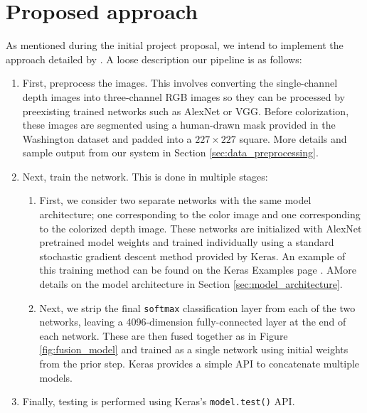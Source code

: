 \documentclass[paper=letter, fontsize=12pt]{article}
\begin{document}
\section{Proposed approach}

As mentioned during the initial project proposal, we intend to implement the approach detailed by \cite{Eitel2015}. A loose description our pipeline is as follows:

\begin{enumerate}

	\item
	First, preprocess the images. This involves converting the single-channel depth images into three-channel RGB images so they can be processed by preexisting trained networks such as AlexNet or VGG. Before colorization, these images are segmented using a human-drawn mask provided in the Washington dataset and padded into a $227 \times 227$ square. More details and sample output from our system in Section \ref{sec:data_preprocessing}.

	\item
	Next, train the network. This is done in multiple stages:

	\begin{enumerate}

		\item
		First, we consider two separate networks with the same model architecture; one corresponding to the color image and one corresponding to the colorized depth image. These networks are initialized with AlexNet pretrained model weights and trained individually using a standard stochastic gradient descent method provided by Keras. An example of this training method can be found on the Keras Examples page \cite{KerasExample}. AMore details on the model architecture in Section \ref{sec:model_architecture}.

		\item
		Next, we strip the final \texttt{softmax} classification layer from each of the two networks, leaving a 4096-dimension fully-connected layer at the end of each network. These are then fused together as in Figure \ref{fig:fusion_model} and trained as a single network using initial weights from the prior step. Keras provides a simple API to concatenate multiple models.

	\end{enumerate}

	\item
	Finally, testing is performed using Keras's \texttt{model.test()} API.

\end{enumerate}
\end{document}
